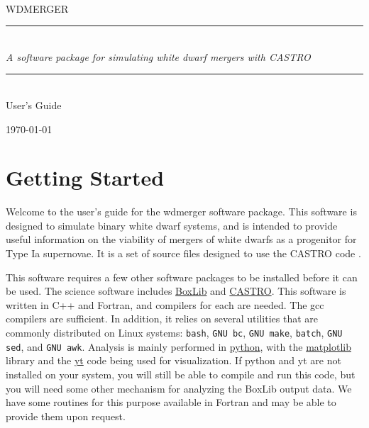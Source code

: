 \documentclass[12pt]{book}
\newcommand{\HRule}{\rule{\linewidth}{0.125mm}}
\begin{document}
\frontmatter

\begin{titlepage}
\begin{center}
\ \\[3in]
{\sf \Huge WDMERGER} 

\begin{minipage}{5.5in}
\HRule\\[2mm]
\centering
{\Large \em A software package for simulating white dwarf mergers with CASTRO}

\HRule
\end{minipage}

\ \\[1 in]
{\sf \huge User's Guide}

\vfill

{\large \today}
\end{center}

\end{titlepage}



\tableofcontents

\clearpage

\mainmatter

\chapter{Getting Started}

Welcome to the user's guide for the wdmerger software package. This software is designed to
simulate binary white dwarf systems, and is intended to provide useful information on the 
viability of mergers of white dwarfs as a progenitor for Type Ia supernovae. It is a set of 
source files designed to use the CASTRO code \citep{castro}.

This software requires a few other software packages to be installed before it can be used.
The science software includes \href{https://ccse.lbl.gov/BoxLib/}{BoxLib} and 
\href{https://ccse.lbl.gov/Downloads/downloadCASTRO.html}{CASTRO}. This software is written 
in C++ and Fortran, and compilers for each are needed. The gcc compilers are sufficient.
In addition, it relies on several utilities that are 
commonly distributed on Linux systems: \texttt{bash}, \texttt{GNU bc}, \texttt{GNU make}, 
\texttt{batch}, \texttt{GNU sed}, and \texttt{GNU awk}. Analysis is mainly performed in 
\href{https://www.python.org/}{python}, with the \href{http://matplotlib.org/}{matplotlib} 
library and the \href{http://yt-project.org/}{yt} code being used for visualization. 
If python and yt are not installed on your system, you will still be able to compile and 
run this code, but you will need some other mechanism for analyzing the BoxLib output data.
We have some routines for this purpose available in Fortran and may be able to provide them
upon request.
\end{document}
